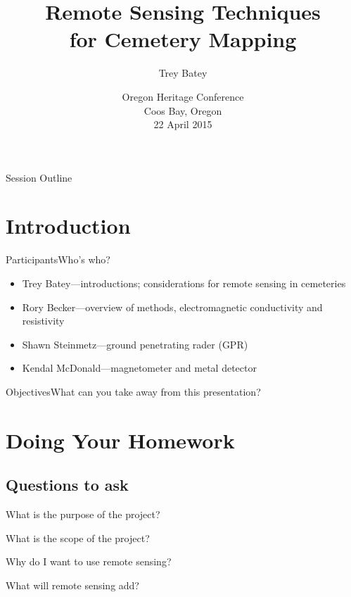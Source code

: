 \documentclass[11pt]{beamer}
\author{Trey Batey}
\title[Remote Sensing Cemeteries]{Remote Sensing Techniques\\for Cemetery Mapping}
\institute{Oregon Commission on Historic Cemeteries}
\date[OHC 2015]{Oregon Heritage Conference\\Coos Bay, Oregon\\22 April 2015}
\begin{document}
\begin{frame}
\titlepage
\end{frame}

\begin{frame}{Session Outline}
\tableofcontents[pausesections]
\end{frame}


\section{Introduction}
\begin{frame}{Participants}{Who's who?}
\begin{itemize}
	\item Trey Batey---introductions; considerations for remote sensing in cemeteries
	\item Rory Becker---overview of methods, electromagnetic conductivity and resistivity
	\item Shawn Steinmetz---ground penetrating rader (GPR)
	\item Kendal McDonald---magnetometer and metal detector
\end{itemize}
\end{frame}

\begin{frame}{Objectives}{What can you take away from this presentation?}
\end{frame}


\section{Doing Your Homework}
\subsection{Questions to ask}
\begin{frame}{What is the purpose of the project?}

\end{frame}

\begin{frame}{What is the scope of the project?}

\end{frame}

\begin{frame}{Why do I want to use remote sensing?}

\end{frame}

\begin{frame}{What will remote sensing add?}

\end{frame}
\end{document}
